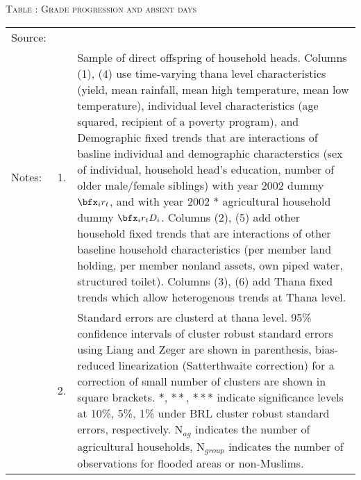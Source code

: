 \begin{table}
\hfil\textsc{\footnotesize Table \thetable: Grade progression and absent days\label{NumGradesDaysAbsentResults}}\\
\setlength{\tabcolsep}{1pt}
\renewcommand{\arraystretch}{.55}
\hfil

\renewcommand{\arraystretch}{1}
\hfil\begin{tabular}{>{\hfill\scriptsize}p{1cm}<{}>{\hfill\scriptsize}p{.5cm}<{}>{\scriptsize}p{12cm}<{\hfill}}
Source:& \multicolumn{2}{l}{\scriptsize Compiled from IFPRI data. }\\[-1ex]
Notes:& 1. & Sample of direct offspring of household heads. Columns \textsf{(1), (4)} use time-varying thana level characteristics (yield, mean rainfall, mean high temperature, mean low temperature), individual level characteristics (age squared, recipient of a poverty program), and \textsf{Demographic fixed trends} that are interactions of basline individual and demographic characterstics (sex of individual, household head's education, number of older male/female siblings) with year 2002 dummy $\bfx_{i}r_{t}$, and with year 2002 * agricultural household dummy $\bfx_{i}r_{t}D_{i}$. Columns \textsf{(2), (5)} add \textsf{other household fixed trends} that are interactions of other baseline household characteristics (per member land holding, per member nonland assets, own piped water, structured toilet). Columns \textsf{(3), (6)} add \textsf{Thana fixed trends} which allow heterogenous trends at Thana level.  \\[-1ex]
& 2. & Standard errors are clusterd at thana level. 95\% confidence intervals of cluster robust standard errors using Liang and Zeger are shown in parenthesis, bias-reduced linearization (Satterthwaite correction) for a correction of small number of clusters are shown in square brackets. $*$, $**$, $***$ indicate significance levels at 10\%, 5\%, 1\% under BRL cluster robust standard errors, respectively. N$_{ag}$ indicates the number of agricultural households, N$_{group}$ indicates the number of observations for flooded areas or non-Muslims. 
\end{tabular}
\end{table}


